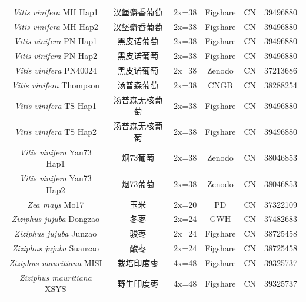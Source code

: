 {{\begin{longtable}{cccccc}
    \textit{Vitis vinifera} MH Hap1 & 汉堡麝香葡萄 & 2x=38 & Figshare & CN & 39496880 \\
    \textit{Vitis vinifera} MH Hap2 & 汉堡麝香葡萄 & 2x=38 & Figshare & CN & 39496880 \\
    \textit{Vitis vinifera} PN Hap1 & 黑皮诺葡萄 & 2x=38 & Figshare & CN & 39496880 \\
    \textit{Vitis vinifera} PN Hap2 & 黑皮诺葡萄 & 2x=38 & Figshare & CN & 39496880 \\
    \textit{Vitis vinifera} PN40024 & 黑皮诺葡萄 & 2x=38 & Zenodo & CN & 37213686 \\
    \textit{Vitis vinifera} Thompson & 汤普森葡萄 & 2x=38 & CNGB & CN & 38288254 \\
    \textit{Vitis vinifera} TS Hap1 & 汤普森无核葡萄 & 2x=38 & Figshare & CN & 39496880 \\
    \textit{Vitis vinifera} TS Hap2 & 汤普森无核葡萄 & 2x=38 & Figshare & CN & 39496880 \\
    \textit{Vitis vinifera} Yan73 Hap1 & 烟73葡萄 & 2x=38 & Zenodo & CN & 38046853 \\
    \textit{Vitis vinifera} Yan73 Hap2 & 烟73葡萄 & 2x=38 & Zenodo & CN & 38046853 \\
    \textit{Zea mays} Mo17 & 玉米 & 2x=20 & PD & CN & 37322109 \\
    \textit{Ziziphus jujuba} Dongzao & 冬枣 & 2x=24 & GWH & CN & 37482683 \\
    \textit{Ziziphus jujuba} Junzao & 骏枣 & 2x=24 & Figshare & CN & 38725458 \\
    \textit{Ziziphus jujuba} Suanzao & 酸枣 & 2x=24 & Figshare & CN & 38725458 \\
    \textit{Ziziphus mauritiana} MISI & 栽培印度枣 & 4x=48 & Figshare & CN & 39325737 \\
    \textit{Ziziphus mauritiana} XSYS & 野生印度枣 & 4x=48 & Figshare & CN & 39325737 \\
    \bottomrule
\end{longtable}
}

\clearpage %

}
